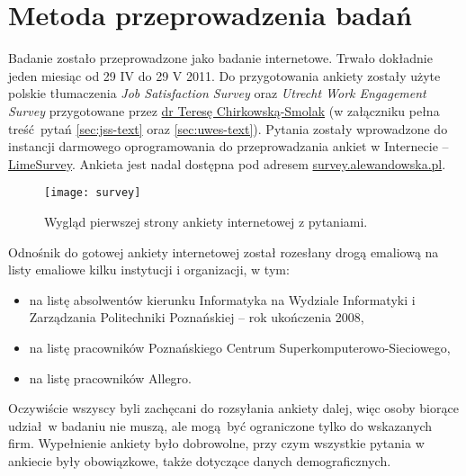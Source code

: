 \chapter{Metoda przeprowadzenia badań}
Badanie zostało przeprowadzone jako badanie internetowe. Trwało dokładnie jeden miesiąc od 29 IV do 29 V 2011. Do przygotowania ankiety zostały użyte polskie tłumaczenia \emph{Job Satisfaction Survey} oraz \emph{Utrecht Work Engagement Survey} przygotowane przez \href{http://www.psychologia.amu.edu.pl/ip-uam/struktura-zatrudnienia-w-instytucie/curriculum-vitae-teresa-chirkowska-smolak/}{dr Teresę Chirkowską-Smolak} (w załączniku pełna treść pytań \ref{sec:jss-text} oraz \ref{sec:uwes-text}). Pytania zostały wprowadzone do instancji darmowego oprogramowania do przeprowadzania ankiet
w Internecie -- \href{http://www.limesurvey.org/}{LimeSurvey}. Ankieta jest nadal dostępna pod
adresem \url{survey.alewandowska.pl}.

\begin{figure}[h]
\begin{center}
\texttt{[image: survey]}
\end{center}
\caption{Wygląd pierwszej strony ankiety internetowej z pytaniami.}
\label{fig:sex}
\end{figure}

Odnośnik do gotowej ankiety internetowej został rozesłany drogą emaliową na listy emaliowe kilku instytucji i organizacji, w tym:
\begin{itemize}
\item na listę absolwentów kierunku Informatyka na Wydziale Informatyki i Zarządzania Politechniki Poznańskiej -- rok ukończenia 2008,
\item na listę pracowników Poznańskiego Centrum Superkomputerowo-Sieciowego,
\item na listę pracowników Allegro.
\end{itemize}
Oczywiście wszyscy byli zachęcani do rozsyłania ankiety dalej, więc osoby biorące udział w badaniu nie muszą, ale mogą być ograniczone tylko do wskazanych firm. Wypełnienie ankiety było dobrowolne, przy czym wszystkie pytania w ankiecie były obowiązkowe, także dotyczące danych demograficznych.
